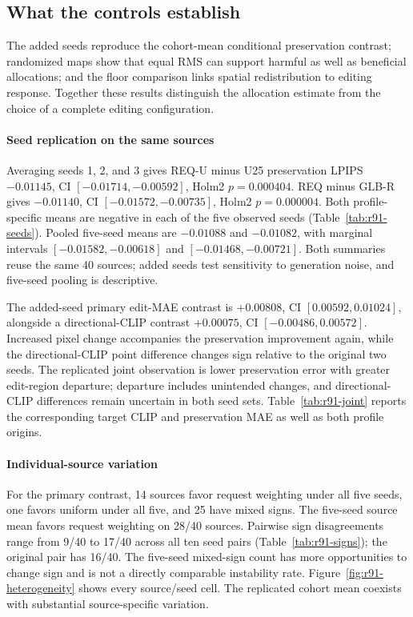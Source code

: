 \subsection{What the controls establish}
The added seeds reproduce the cohort-mean conditional preservation contrast; randomized maps show that equal RMS can support harmful as well as beneficial allocations; and the floor comparison links spatial redistribution to editing response. Together these results distinguish the allocation estimate from the choice of a complete editing configuration.
\paragraph{Seed replication on the same sources}
Averaging seeds 1, 2, and 3 gives REQ-U minus U25 preservation LPIPS $-0.01145$, CI $[-0.01714,-0.00592]$, Holm2 $p=0.000404$. REQ minus GLB-R gives $-0.01140$, CI $[-0.01572,-0.00735]$, Holm2 $p=0.000004$. Both profile-specific means are negative in each of the five observed seeds (Table~\ref{tab:r91-seeds}). Pooled five-seed means are $-0.01088$ and $-0.01082$, with marginal intervals $[-0.01582,-0.00618]$ and $[-0.01468,-0.00721]$. Both summaries reuse the same 40 sources; added seeds test sensitivity to generation noise, and five-seed pooling is descriptive.

The added-seed primary edit-MAE contrast is $+0.00808$, CI $[0.00592,0.01024]$, alongside a directional-CLIP contrast $+0.00075$, CI $[-0.00486,0.00572]$. Increased pixel change accompanies the preservation improvement again, while the directional-CLIP point difference changes sign relative to the original two seeds. The replicated joint observation is lower preservation error with greater edit-region departure; departure includes unintended changes, and directional-CLIP differences remain uncertain in both seed sets. Table~\ref{tab:r91-joint} reports the corresponding target CLIP and preservation MAE as well as both profile origins.

\paragraph{Individual-source variation}
For the primary contrast, 14 sources favor request weighting under all five seeds, one favors uniform under all five, and 25 have mixed signs. The five-seed source mean favors request weighting on 28/40 sources. Pairwise sign disagreements range from 9/40 to 17/40 across all ten seed pairs (Table~\ref{tab:r91-signs}); the original pair has 16/40. The five-seed mixed-sign count has more opportunities to change sign and is not a directly comparable instability rate. Figure~\ref{fig:r91-heterogeneity} shows every source/seed cell. The replicated cohort mean coexists with substantial source-specific variation.

